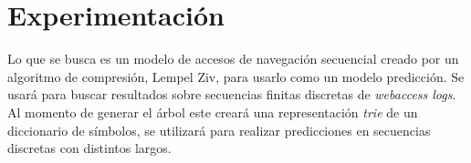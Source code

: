 \chapter[Experimentación]{Experimentación}\label{ch:experimetal-all}


























{
}

Lo que se busca es un modelo de accesos de navegación secuencial creado por un algoritmo de compresión, Lempel Ziv,  para usarlo como un modelo  predicción. Se usará para buscar resultados sobre secuencias finitas discretas de \emph{webaccess logs}. Al momento de generar el árbol este creará una representación \emph{trie} de un diccionario de símbolos, se utilizará para realizar predicciones en secuencias discretas con distintos largos.

